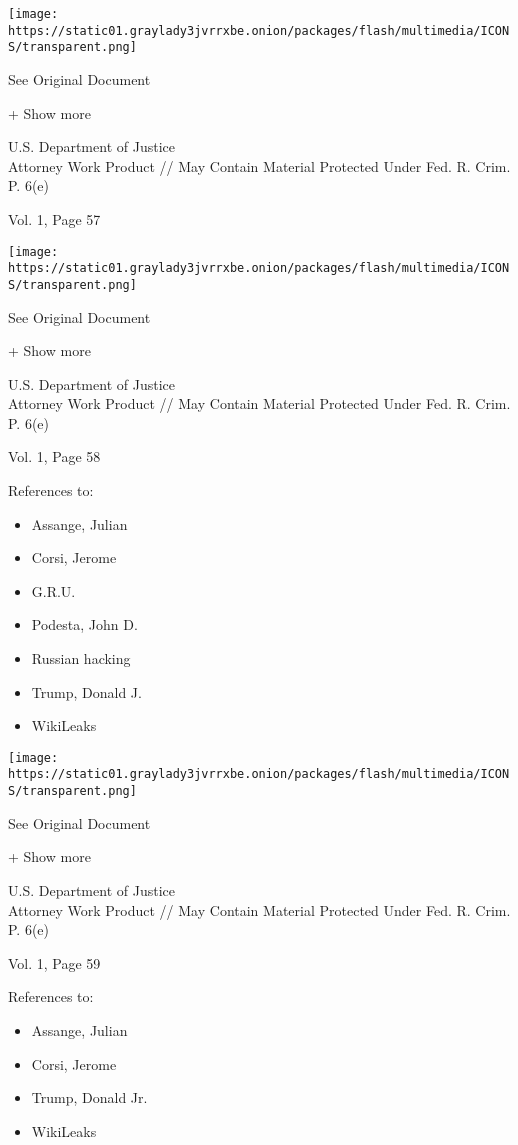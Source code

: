 \protect\hyperlink{}{}

\texttt{[image: https://static01.graylady3jvrrxbe.onion/packages/flash/multimedia/ICONS/transparent.png]}

See Original Document

+ Show more

U.S. Department of Justice\\
Attorney Work Product // May Contain Material Protected Under Fed. R.
Crim. P. 6(e)

Vol. 1, Page 57

\protect\hyperlink{}{}

\texttt{[image: https://static01.graylady3jvrrxbe.onion/packages/flash/multimedia/ICONS/transparent.png]}

See Original Document

+ Show more

U.S. Department of Justice\\
Attorney Work Product // May Contain Material Protected Under Fed. R.
Crim. P. 6(e)

Vol. 1, Page 58

References to:

\begin{itemize}
\tightlist
\item
  Assange, Julian
\item
  Corsi, Jerome
\item
  G.R.U.
\item
  Podesta, John D.
\item
  Russian hacking
\item
  Trump, Donald J.
\item
  WikiLeaks
\end{itemize}

\protect\hyperlink{}{}

\texttt{[image: https://static01.graylady3jvrrxbe.onion/packages/flash/multimedia/ICONS/transparent.png]}

See Original Document

+ Show more

U.S. Department of Justice\\
Attorney Work Product // May Contain Material Protected Under Fed. R.
Crim. P. 6(e)

Vol. 1, Page 59

References to:

\begin{itemize}
\tightlist
\item
  Assange, Julian
\item
  Corsi, Jerome
\item
  Trump, Donald Jr.
\item
  WikiLeaks
\end{itemize}

